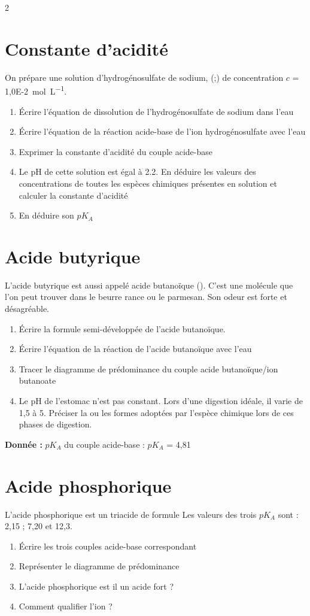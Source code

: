 \documentclass[a4paper,11pt,fleqn]{article}%
\begin{document}
\begin{multicols}{2}
\section{Constante d'acidité}
On prépare une solution d'hydrogénosulfate de sodium, (;) de concentration $c$ = \SI{1,0E-2}{\mole \per \liter}.
\begin{enumerate}
	\item Écrire l'équation de dissolution de l'hydrogénosulfate de sodium dans l'eau
	\item Écrire l'équation de la réaction acide-base de l'ion hydrogénosulfate avec l'eau
	\item Exprimer la constante d'acidité du couple acide-base
	\item Le pH de cette solution est égal à \num{2,2}. En déduire les valeurs des concentrations de toutes les espèces chimiques présentes en solution et calculer la constante d'acidité
	\item En déduire son $pK_A$
\end{enumerate}

\section{Acide butyrique}
L'acide butyrique est aussi appelé acide butanoïque (). C'est une molécule que l'on peut trouver dans le beurre rance ou le parmesan. Son odeur est forte et désagréable.
\begin{enumerate}
	\item Écrire la formule semi-développée de l'acide butanoïque.
	\item Écrire l'équation de la réaction de l'acide butanoïque avec l'eau
	\item Tracer le diagramme de prédominance du couple acide butanoïque/ion butanoate
	\item Le pH de l'estomac n'est pas constant. Lors d'une digestion idéale, il varie de 1,5 à 5. Préciser la ou les formes adoptées par l'espèce chimique lors de ces phases de digestion.
\end{enumerate}
\textbf{Donnée :} $pK_A$ du couple acide-base : $pK_A$ = 4,81

\section{Acide phosphorique}
L'acide phosphorique est un triacide de formule  Les valeurs des trois $pK_A$ sont : 2,15 ; 7,20 et 12,3.
\begin{enumerate}
	\item Écrire les trois couples acide-base correspondant
	\item Représenter le diagramme de prédominance
	\item L'acide phosphorique est il un acide fort ?
	\item Comment qualifier l'ion  ?
\end{enumerate}


\end{multicols}
\end{document}
